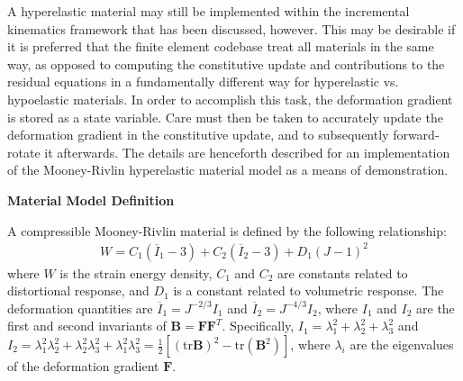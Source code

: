 A hyperelastic material may still be implemented within the incremental kinematics framework that has been discussed, however. This may be desirable if it is preferred that the finite element codebase treat all materials in the same way, as opposed to computing the constitutive update and contributions to the residual equations in a fundamentally different way for hyperelastic vs. hypoelastic materials. In order to accomplish this task, the deformation gradient is stored as a state variable. Care must then be taken to accurately update the deformation gradient in the constitutive update, and to subsequently forward-rotate it afterwards. The details are henceforth described for an implementation of the Mooney-Rivlin hyperelastic material model as a means of demonstration.

\textbf{Material Model Definition}

A compressible Mooney-Rivlin material is defined by the following relationship:
\begin{align}
W = C_1(\overline{I}_1 - 3) + C_2(\overline{I}_2 - 3) + D_1(J - 1)^2
\end{align}
where $W$ is the strain energy density, $C_1$ and $C_2$ are constants related to distortional response, and $D_1$ is a constant related to volumetric response. The deformation quantities are $\overline{I}_1 = J^{-2/3}I_1$ and $\overline{I}_2 = J^{-4/3}I_2$, where $I_1$ and $I_2$ are the first and second invariants of $\bm{B} = {\bm F}{\bm F}^T$. Specifically, $I_1 = \lambda_1^2 + \lambda_2^2 + \lambda_3^2$ and $I_2 = \lambda_1^2\lambda_2^2 + \lambda_2^2\lambda_3^2 + \lambda_1^2\lambda_3^2 = \frac{1}{2}[(\text{tr}{\bm B})^2 - \text{tr}({\bm B}^2)]$, where $\lambda_i$ are the eigenvalues of the deformation gradient ${\bm F}$.

